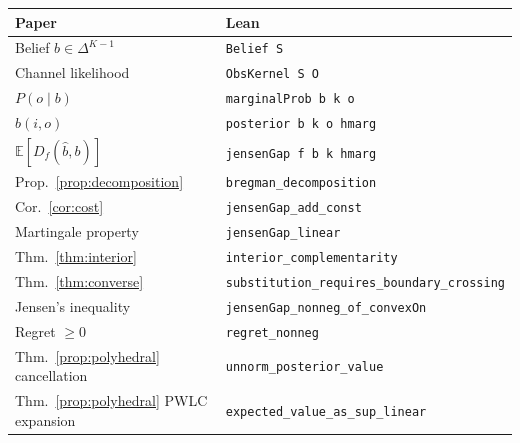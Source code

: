\documentclass{article}
\newcommand{\bpost}{\hat{b}}
\newcommand{\E}{\mathbb{E}}
\begin{document}
\begin{center}
\footnotesize
\begin{tabular}{@{}ll@{}}
\toprule
Paper & Lean \\
\midrule
Belief $b \in \Delta^{K-1}$ & \texttt{Belief S} \\
Channel likelihood & \texttt{ObsKernel S O} \\
$P(o \mid b)$ & \texttt{marginalProb b k o} \\
$\bpost(i,o)$ & \texttt{posterior b k o hmarg} \\
$\E[D_f(\bpost, b)]$ & \texttt{jensenGap f b k hmarg} \\
\midrule
Prop.~\ref{prop:decomposition} & \texttt{bregman\_decomposition} \\
Cor.~\ref{cor:cost} & \texttt{jensenGap\_add\_const} \\
Martingale property & \texttt{jensenGap\_linear} \\
Thm.~\ref{thm:interior} & \texttt{interior\_complementarity} \\
Thm.~\ref{thm:converse} & \texttt{substitution\_requires\_boundary\_crossing} \\
Jensen's inequality & \texttt{jensenGap\_nonneg\_of\_convexOn} \\
Regret $\geq 0$ & \texttt{regret\_nonneg} \\
Thm.~\ref{prop:polyhedral} cancellation & \texttt{unnorm\_posterior\_value} \\
Thm.~\ref{prop:polyhedral} PWLC expansion & \texttt{expected\_value\_as\_sup\_linear} \\
\bottomrule
\end{tabular}
\end{center}
\end{document}
